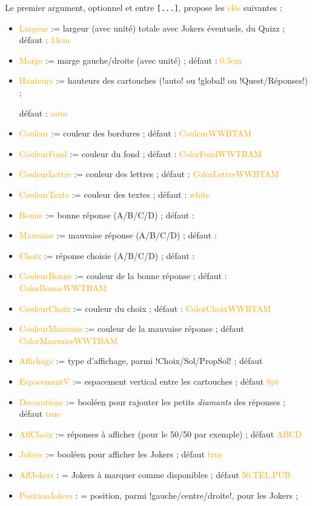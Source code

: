 \documentclass[french,a4paper,11pt]{article}
\newcommand\Cle[1]{{\small\sffamily\textlangle \textcolor{orange}{#1}\textrangle}}
\newcommand\cmaj[1]{\tcbox[vignetteMaJ]{#1}\xspace}
\begin{document}
\begin{tipblock}
Le premier argument, optionnel et entre \texttt{[...]}, propose les \Cle{clés} suivantes :

\begin{itemize}
	\item \Cle{Largeur} := largeur (avec unité) totale avec Jokers éventuels, du Quizz ; \hfill{}défaut : \Cle{14cm}
	\item \Cle{Marge} := marge gauche/droite (avec unité) ; \hfill{}défaut : \Cle{0.5cm}
	\item \Cle{Hauteurs} := hauteurs des cartouches (\motcletex!auto! ou \motcletex!global! ou \motcletex!Quest/Réponses!) ;
	
	\hfill{}défaut : \Cle{auto}
	\item \Cle{Couleur} := couleur des bordures ; \hfill{}défaut : \Cle{CouleurWWBTAM}
	\item \Cle{CouleurFond} := couleur du fond ; \hfill{}défaut : \Cle{ColorFondWWTBAM}
	\item \Cle{CouleurLettre} := couleur des lettres ; \hfill{}défaut : \Cle{ColorLettreWWBTAM}
	\item \Cle{CouleurTexte} := couleur des textes ; \hfill{}défaut : \Cle{white}
	\item \Cle{Bonne} := bonne réponse (A/B/C/D) ; \hfill{}défaut : \Cle{}
	\item \Cle{Mauvaise} := mauvaise réponse (A/B/C/D) ; \hfill{}défaut : \Cle{}
	\item \Cle{Choix} := réponse choisie (A/B/C/D) ; \hfill{}défaut : \Cle{}
	\item \Cle{CouleurBonne} := couleur de la bonne réponse ; \hfill{}défaut : \Cle{ColorBonneWWTBAM}
	\item \Cle{CouleurChoix} := couleur du choix ; \hfill{}défaut : \Cle{ColorChoixWWBTAM}
	\item \Cle{CouleurMauvaise} := couleur de la mauvaise réponse ; \hfill{}défaut \Cle{ColorMauvaiseWWTBAM}
	\item \Cle{Affichage} := type d'affichage, parmi \motcletex!Choix/Sol/PropSol! ; \hfill{}défaut \Cle{}
	\item \Cle{EspacementV} := espacement vertical entre les cartouches ; \hfill{}défaut \Cle{8pt}
	\item \Cle{Decorations} := booléen pour rajouter les petits \textit{diamants} des réponses  ; \hfill{}défaut \Cle{true}
	\item \Cle{AffChoix} := réponses à afficher (pour le 50/50 par exemple)  ; \hfill{}défaut \Cle{ABCD}
	\item \Cle{Jokers} := booléen pour afficher les Jokers ; \hfill{}défaut \Cle{true}
	\item \Cle{AffJokers} : = Jokers à marquer comme disponibles ; \hfill{}défaut \Cle{50.TEL.PUB}
	\item \cmaj{0.1.1} \Cle{PositionJokers} : = position, parmi \motcletex!gauche/centre/droite!, pour les Jokers ;
	

\end{itemize}
\end{tipblock}
\end{document}
